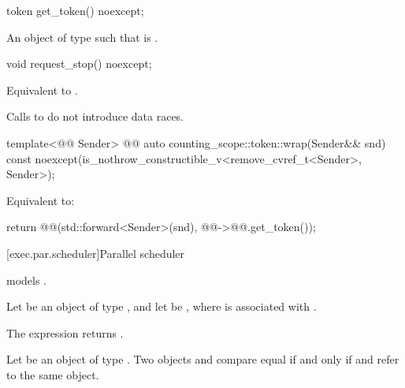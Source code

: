 %
\begin{itemdecl}
token get_token() noexcept;
\end{itemdecl}

\begin{itemdescr}
\pnum
\returns
An object  of type  such that
 is .
\end{itemdescr}

%
\begin{itemdecl}
void request_stop() noexcept;
\end{itemdecl}

\begin{itemdescr}
\pnum
\effects
Equivalent to .

\pnum
\remarks
Calls to  do not introduce data races.
\end{itemdescr}

%
\begin{itemdecl}
template<@@ Sender>
  @@ auto counting_scope::token::wrap(Sender&& snd) const
    noexcept(is_nothrow_constructible_v<remove_cvref_t<Sender>, Sender>);
\end{itemdecl}

\begin{itemdescr}
\pnum
\effects
Equivalent to:
\begin{codeblock}
return @@(std::forward<Sender>(snd), @@->@@.get_token());
\end{codeblock}
\end{itemdescr}

[exec.par.scheduler]{Parallel scheduler}

\pnum
{} models .

\pnum
Let  be an object of type , and
let  be ,
where  is associated with .

\pnum
The expression  returns
.

\pnum
Let  be an object of type .
Two objects  and  compare equal if and only if
 and
 refer to the same object.

